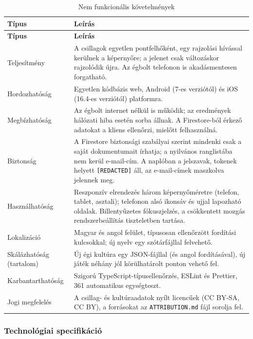\documentclass[12pt,a4paper]{article}
\newcommand{\fejlec}{\rowcolor{egkekvil}}
\newcommand{\kod}[1]{\texttt{\small #1}}
\begin{document}
{\small
\begin{longtable}{|L{4.3cm}|L{10.75cm}|}
  \caption{Nem funkcionális követelmények}\label{tab:nemfunkc}\\
  \hline
  \fejlec\textbf{Típus} & \textbf{Leírás} \\ \hline
  \endfirsthead
  \hline
  \fejlec\textbf{Típus} & \textbf{Leírás} \\ \hline
  \endhead
  Teljesítmény & A csillagok egyetlen pontfelhőként, egy rajzolási hívással kerülnek a
  képernyőre; a jelenet csak változáskor rajzolódik újra. Az égbolt telefonon is akadásmentesen
  forgatható. \\ \hline
  Hordozhatóság & Egyetlen kódbázis web, Android (7-es verziótól) és iOS (16.4-es verziótól)
  platformra. \\ \hline
  Megbízhatóság & Az égbolt internet nélkül is működik; az eredmények hálózati hiba esetén
  sorba állnak. A Firestore-ból érkező adatokat a kliens ellenőrzi, mielőtt felhasználná. \\ \hline
  Biztonság & A Firestore biztonsági szabályai szerint mindenki csak a saját dokumentumait
  írhatja; a nyilvános ranglistába nem kerül e-mail-cím. A naplóban a jelszavak, tokenek helyett
  \kod{[REDACTED]} áll, az e-mail-címek maszkolva jelennek meg. \\ \hline
  Használhatóság & Reszponzív elrendezés három képernyőméretre (telefon, tablet, asztali); telefonon
  alsó ikonsáv és ujjal lapozható oldalak. Billentyűzetes fókuszjelzés, a csökkentett mozgás
  rendszerbeállítás tiszteletben tartása. \\ \hline
  Lokalizáció & Magyar és angol felület, típusosan ellenőrzött fordítási kulcsokkal; új nyelv
  egy szótárfájllal felvehető. \\ \hline
  Skálázhatóság (tartalom) & Új égi kultúra egy JSON-fájllal (és angol fordításával), új játék
  néhány jól körülhatárolt ponton vehető fel. \\ \hline
  Karbantarthatóság & Szigorú TypeScript-típusellenőrzés, ESLint és Prettier, 361 automatikus
  egységteszt. \\ \hline
  Jogi megfelelés & A csillag- és kultúraadatok nyílt licencűek (CC BY-SA, CC BY), a forrásokat
  az \kod{ATTRIBUTION.md} fájl sorolja fel. \\ \hline
\end{longtable}
}

\subsubsection{Technológiai specifikáció}
\end{document}
